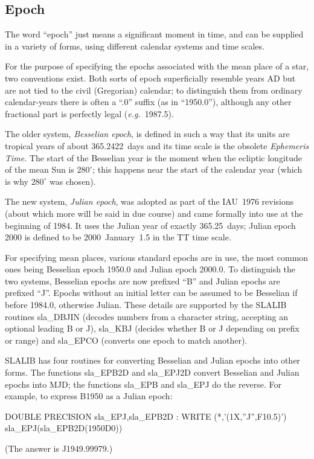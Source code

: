 \documentclass[11pt,twoside,nolof]{starlink}
\begin{document}
\subsection{Epoch}
The word ``epoch'' just means a significant
moment in time, and can be supplied
in a variety of forms, using different calendar systems and time scales.

For the purpose of specifying the epochs associated with the
mean place of a star, two conventions exist.  Both sorts of epoch
superficially resemble years AD but are not tied to the civil
(Gregorian) calendar;  to distinguish them from ordinary calendar-years
there is often
a ``.0'' suffix (as in ``1950.0''), although any other fractional
part is perfectly legal (\textit{e.g.}\ 1987.5).

The older system,
\textit{Besselian epoch}, is defined in such a way that its units are
tropical years of about 365.2422~days and its time scale is the
obsolete \textit{Ephemeris Time}.
The start of the Besselian year is the moment
when the ecliptic longitude of the mean Sun is
$280^{\circ}$;  this happens near the start of the
calendar year (which is why $280^{\circ}$ was chosen).

The new system, \textit{Julian epoch}, was adopted as
part of the IAU~1976 revisions (about which more will be said
in due course) and came formally into use at the
beginning of 1984.  It uses the Julian year of exactly
365.25~days; Julian epoch 2000 is defined to be 2000~January~1.5 in the
TT time scale.

For specifying mean places, various standard epochs are in use, the
most common ones being Besselian epoch 1950.0 and Julian epoch 2000.0.
To distinguish the two systems, Besselian epochs
are now prefixed ``B'' and Julian epochs are prefixed ``J''.
Epochs without an initial letter can be assumed to be Besselian
if before 1984.0, otherwise Julian.  These details are supported by
the SLALIB routines
sla\_DBJIN
(decodes numbers from a
character string, accepting an optional leading B or J),
sla\_KBJ
(decides whether B or J depending on prefix or range) and
sla\_EPCO
(converts one epoch to match another).

SLALIB has four routines for converting
Besselian and Julian epochs into other forms.
The functions
sla\_EPB2D
and
sla\_EPJ2D
convert Besselian and Julian epochs into MJD; the functions
sla\_EPB
and
sla\_EPJ
do the reverse.  For example, to express B1950 as a Julian epoch:
\goodbreak
\begin{terminalv}
            DOUBLE PRECISION sla_EPJ,sla_EPB2D
             :
            WRITE (*,'(1X,''J'',F10.5)') sla_EPJ(sla_EPB2D(1950D0))
\end{terminalv}
\goodbreak
(The answer is J1949.99979.)
\end{document}
